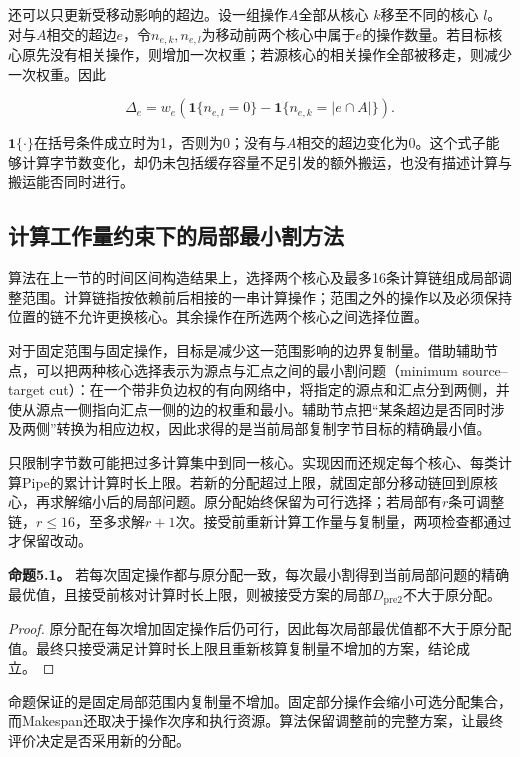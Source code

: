 \documentclass[anonymous,notoc]{gmcm2026}
\begin{document}
还可以只更新受移动影响的超边。设一组操作\(A\)全部从核心 \(k\)移至不同的核心 \(l\)。对与\(A\)相交的超边\(e\)，令\(n_{e,k},n_{e,l}\)为移动前两个核心中属于\(e\)的操作数量。若目标核心原先没有相关操作，则增加一次权重；若源核心的相关操作全部被移走，则减少一次权重。因此

\begin{equation}
\Delta_e=w_e\left(\mathbf1\{n_{e,l}=0\}-\mathbf1\{n_{e,k}=|e\cap A|\}\right).
\end{equation}

\(\mathbf1\{\cdot\}\)在括号条件成立时为1，否则为0；没有与\(A\)相交的超边变化为0。这个式子能够计算字节数变化，却仍未包括缓存容量不足引发的额外搬运，也没有描述计算与搬运能否同时进行。

\subsection{计算工作量约束下的局部最小割方法}

算法在上一节的时间区间构造结果上，选择两个核心及最多16条计算链组成局部调整范围。计算链指按依赖前后相接的一串计算操作；范围之外的操作以及必须保持位置的链不允许更换核心。其余操作在所选两个核心之间选择位置。

对于固定范围与固定操作，目标是减少这一范围影响的边界复制量。借助辅助节点，可以把两种核心选择表示为源点与汇点之间的最小割问题（minimum source--target cut）：在一个带非负边权的有向网络中，将指定的源点和汇点分到两侧，并使从源点一侧指向汇点一侧的边的权重和最小。辅助节点把``某条超边是否同时涉及两侧''转换为相应边权，因此求得的是当前局部复制字节目标的精确最小值。

只限制字节数可能把过多计算集中到同一核心。实现因而还规定每个核心、每类计算Pipe的累计计算时长上限。若新的分配超过上限，就固定部分移动链回到原核心，再求解缩小后的局部问题。原分配始终保留为可行选择；若局部有\(r\)条可调整链，\(r\le16\)，至多求解\(r+1\)次。接受前重新计算工作量与复制量，两项检查都通过才保留改动。

\textbf{命题5.1。} 若每次固定操作都与原分配一致，每次最小割得到当前局部问题的精确最优值，且接受前核对计算时长上限，则被接受方案的局部\(D_{\mathrm{pre2}}\)不大于原分配。

\begin{proof} 原分配在每次增加固定操作后仍可行，因此每次局部最优值都不大于原分配值。最终只接受满足计算时长上限且重新核算复制量不增加的方案，结论成立。\end{proof}

命题保证的是固定局部范围内复制量不增加。固定部分操作会缩小可选分配集合，而Makespan还取决于操作次序和执行资源。算法保留调整前的完整方案，让最终评价决定是否采用新的分配。
\end{document}
